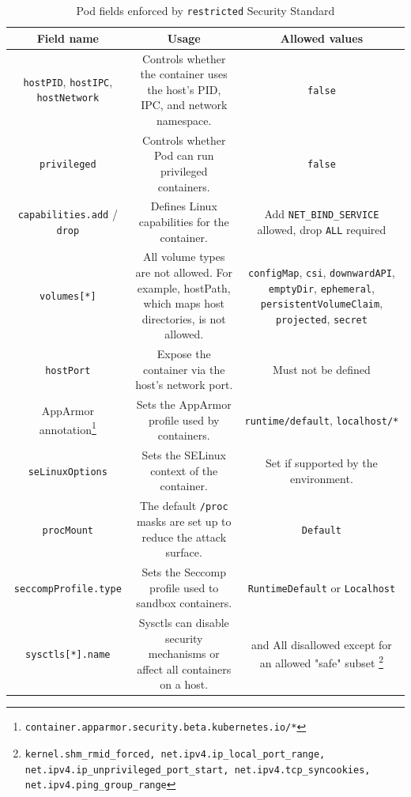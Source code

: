 \documentclass[english, 12pt, a4paper, sci, utf8, a-2b, online]{aaltothesis}
\begin{document}
\begin{table}[H]
  \centering
  \caption{Pod fields enforced by \lstinline{restricted} Security Standard}
  \label{table:pod-hardening}
  \sffamily
  \small
  \begin{minipage}{\textwidth}
  \renewcommand{\thempfootnote}{\arabic{mpfootnote}}
  \begin{tabularx}{\textwidth}{CCC}
    \hline
    \textbf{Field name} & \textbf{Usage} & \textbf{Allowed values}\\ \hline
    \lstinline{hostPID}, \lstinline{hostIPC}, \lstinline{hostNetwork} & Controls whether the container uses the host's PID, IPC, and network namespace. & \lstinline{false} \\ \hline
    \lstinline{privileged} & Controls whether Pod can run privileged containers. & \lstinline{false} \\ \hline
    \lstinline{capabilities.add} / \lstinline{drop} & Defines Linux capabilities for the container. & Add \lstinline{NET_BIND_SERVICE} allowed, drop \lstinline{ALL} required \\ \hline
    \lstinline{volumes[*]} & All volume types are not allowed. For example, hostPath, which maps host directories, is not allowed. & \lstinline{configMap}, \lstinline{csi}, \lstinline{downwardAPI}, \lstinline{emptyDir}, \lstinline{ephemeral}, \lstinline{persistentVolumeClaim}, \lstinline{projected}, \lstinline{secret} \\ \hline
    \lstinline{hostPort} & Expose the container via the host's network port. & Must not be defined \\ \hline
    AppArmor annotation\footnote{\lstinline{container.apparmor.security.beta.kubernetes.io/*}} & Sets the AppArmor profile used by containers. & \lstinline{runtime/default}, \lstinline{localhost/*} \\ \hline
    \lstinline{seLinuxOptions} & Sets the SELinux context of the container. & Set if supported by the environment. \\ \hline
    \lstinline{procMount} & The default \lstinline{/proc} masks are set up to reduce the attack surface. & \lstinline{Default} \\ \hline
    \lstinline{seccompProfile.type} & Sets the Seccomp profile used to sandbox containers. & \lstinline{RuntimeDefault} or \lstinline{Localhost} \\ \hline
    \lstinline{sysctls[*].name} & Sysctls can disable security mechanisms or affect all containers on a host. &  and All disallowed except for an allowed "safe" subset \footnote{\lstinline{kernel.shm_rmid_forced, net.ipv4.ip_local_port_range, net.ipv4.ip_unprivileged_port_start, net.ipv4.tcp_syncookies, net.ipv4.ping_group_range}} \\ \hline

\end{tabularx}
\end{minipage}
\end{table}
\end{document}
